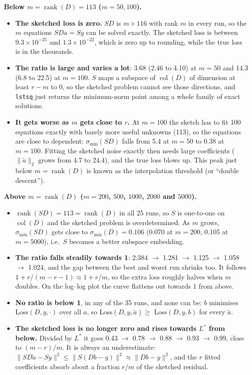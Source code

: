 \textbf{Below $m = \operatorname{rank}(D) = 113$ ($m = 50, 100$).}
\begin{itemize}
    \item \textbf{The sketched loss is zero.} $SD$ is $m \times 116$ with rank $m$ in every run, so the $m$
    equations $SDa = Sy$ can be solved exactly. The sketched loss is between $9.3\times10^{-25}$ and $1.3\times10^{-22}$, which is
    zero up to rounding, while the true loss is in the thousands.
    \item \textbf{The ratio is large and varies a lot}: 3.68 (2.46 to 4.10) at $m = 50$ and
    14.3 (6.8 to 22.5) at $m = 100$. $S$ maps a subspace of $\operatorname{col}(D)$ of dimension
    at least $r-m$ to $0$, so the sketched problem cannot see those directions, and \texttt{lstsq} just returns
    the minimum-norm point among a whole family of exact solutions.
    \item \textbf{It gets worse as $m$ gets close to $r$.} At $m = 100$ the sketch has to fit 100 equations
    exactly with barely more useful unknowns (113), so the equations are close to dependent:
    $\sigma_{\min}(SD)$ falls from 5.4 at $m = 50$ to 0.38 at $m = 100$. Fitting the sketched noise
    exactly then needs large coefficients ($\|\tilde a\|_2$ grows from 4.7 to 24.4), and the true
    loss blows up. This peak just below $m = \operatorname{rank}(D)$ is known as the interpolation threshold
    (or ``double descent'').
\end{itemize}

\textbf{Above $m = \operatorname{rank}(D)$ ($m = 200$, $500$, $1000$, $2000$ and $5000$).}
\begin{itemize}
    \item $\operatorname{rank}(SD) = 113 = \operatorname{rank}(D)$ in all 25 runs, so $S$ is one-to-one on
    $\operatorname{col}(D)$ and the sketched problem is overdetermined. As $m$ grows, $\sigma_{\min}(SD)$ gets
    close to $\sigma_{\min}(D) = 0.106$ (0.070 at $m = 200$, 0.105 at
    $m = 5000$), i.e.\ $S$ becomes a better subspace embedding.
    \item \textbf{The ratio falls steadily towards 1}: 2.384 $\to$ 1.281 $\to$ 1.125 $\to$ 1.058 $\to$ 1.024, and the gap between the best and worst
    run shrinks too. It follows $1 + r/(m-r-1) \approx 1 + r/m$, so the extra loss roughly halves when $m$
    doubles. On the log--log plot the curve flattens out towards 1 from above.
    \item \textbf{No ratio is below 1}, in any of the 35 runs, and none can be: $b$ minimises
    Loss$(D,y,\cdot)$ over all $a$, so Loss$(D,y,\tilde a) \ge$ Loss$(D,y,b)$ for every $\tilde a$.
    \item \textbf{The sketched loss is no longer zero and rises towards $L^*$ from below.} Divided by $L^*$
    it goes 0.43 $\to$ 0.78 $\to$ 0.88 $\to$ 0.93 $\to$ 0.99, close to $(m-r)/m$. It is always an underestimate:
    $\|SD\tilde a-Sy\|^2 \le \|S(Db-y)\|^2 \approx \|Db-y\|^2$, and the $r$ fitted coefficients absorb about a
    fraction $r/m$ of the sketched residual.
\end{itemize}

